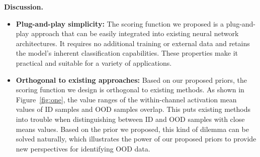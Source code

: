 \noindent\textbf{Discussion.}
\begin{itemize}
    \item \textbf{Plug-and-play simplicity:} The scoring function we proposed is a  plug-and-play approach that can be easily integrated into existing neural network architectures. It requires no additional training or external data and retains the model's inherent classification capabilities. These properties make it practical and suitable for a variety of applications.

    \item \textbf{Orthogonal to existing approaches:} Based on our proposed priors, the scoring function we design is orthogonal to existing methods. As shown in Figure~\ref{fig:one}, the value ranges of the within-channel activation mean values of ID samples and OOD samples overlap. This puts existing methods into trouble when distinguishing between ID and OOD samples with close means values. Based on the prior we proposed, this kind of dilemma can be solved naturally, which illustrates the power of our proposed priors to provide new perspectives for identifying OOD data.
\end{itemize}